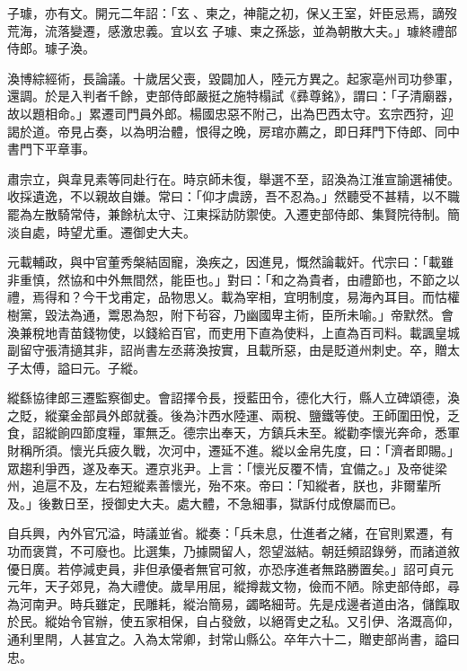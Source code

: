\begin{pinyinscope}
 子璩，亦有文。開元二年詔：「玄、柬之，神龍之初，保乂王室，奸臣忌焉，謫歿荒海，流落變遷，感激忠義。宜以玄子璩、柬之孫毖，並為朝散大夫。」璩終禮部侍郎。璩子渙。



 渙博綜經術，長論議。十歲居父喪，毀闢加人，陸元方異之。起家亳州司功參軍，還調。於是入判者千餘，吏部侍郎嚴挺之施特榻試《彞尊銘》，謂曰：「子清廟器，故以題相命。」累遷司門員外郎。楊國忠惡不附己，出為巴西太守。玄宗西狩，迎謁於道。帝見占奏，以為明治體，恨得之晚，房琯亦薦之，即日拜門下侍郎、同中書門下平章事。



 肅宗立，與韋見素等同赴行在。時京師未復，舉選不至，詔渙為江淮宣諭選補使。收採遺逸，不以親故自嫌。常曰：「仰才虞謗，吾不忍為。」然聽受不甚精，以不職罷為左散騎常侍，兼餘杭太守、江東採訪防禦使。入遷吏部侍郎、集賢院待制。簡淡自處，時望尤重。遷御史大夫。



 元載輔政，與中官董秀槃結固寵，渙疾之，因進見，慨然論載奸。代宗曰：「載雖非重慎，然協和中外無間然，能臣也。」對曰：「和之為貴者，由禮節也，不節之以禮，焉得和？今干戈甫定，品物思乂。載為宰相，宜明制度，易海內耳目。而怙權樹黨，毀法為通，鬻恩為恕，附下茍容，乃幽國卑主術，臣所未喻。」帝默然。會渙兼稅地青苗錢物使，以錢給百官，而吏用下直為使料，上直為百司料。載諷皇城副留守張清擿其非，詔尚書左丞蔣渙按實，且載所惡，由是貶道州刺史。卒，贈太子太傅，謚曰元。子縱。



 縱繇協律郎三遷監察御史。會詔擇令長，授藍田令，德化大行，縣人立碑頌德，渙之貶，縱棄金部員外郎就養。後為汴西水陸運、兩稅、鹽鐵等使。王師圍田悅，乏食，詔縱餉四節度糧，軍無乏。德宗出奉天，方鎮兵未至。縱勸李懷光奔命，悉軍財稱所須。懷光兵疲久戰，次河中，遷延不進。縱以金帛先度，曰：「濟者即賜。」眾趨利爭西，遂及奉天。遷京兆尹。上言：「懷光反覆不情，宜備之。」及帝徙梁州，追扈不及，左右短縱素善懷光，殆不來。帝曰：「知縱者，朕也，非爾輩所及。」後數日至，授御史大夫。處大體，不急細事，獄訴付成僚屬而已。



 自兵興，內外官冗溢，時議並省。縱奏：「兵未息，仕進者之緒，在官則累遷，有功而褒賞，不可廢也。比選集，乃據闕留人，怨望滋結。朝廷頻詔錄勞，而諸道敘優日廣。若停減吏員，非但承優者無官可敘，亦恐序進者無路勝置矣。」詔可貞元元年，天子郊見，為大禮使。歲旱用屈，縱撙裁文物，儉而不陋。除吏部侍郎，尋為河南尹。時兵雖定，民雕耗，縱治簡易，蠲略細苛。先是戍邊者道由洛，儲餼取於民。縱始令官辦，使五家相保，自占發斂，以絕胥史之私。又引伊、洛溉高仰，通利里閈，人甚宜之。入為太常卿，封常山縣公。卒年六十二，贈吏部尚書，謚曰忠。




\end{pinyinscope}
